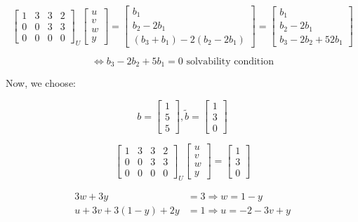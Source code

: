 \[
  \begin{bmatrix}
    1 & 3 & 3 & 2 \\
    0 & 0 & 3 & 3 \\
    0 & 0 & 0 & 0
  \end{bmatrix}_U 
  \begin{bmatrix}
    u \\ v \\ w \\y
  \end{bmatrix} = 
  \begin{bmatrix}
    b_1 \\ b_2 - 2b_1 \\ (b_3 + b_1) - 2(b_2 - 2b_1)
  \end{bmatrix} = 
    \begin{bmatrix}
    b_1 \\ b_2 - 2b_1 \\ b_3 - 2b_2 + 52b_1
  \end{bmatrix}
\]

\[
  \iff b_3 - 2b_2 + 5b_1 = 0 \text{ solvability condition}
\]

Now, we choose:

\[
  b = \begin{bmatrix}
    1 \\ 5 \\ 5
  \end{bmatrix},
  \tilde{b} = \begin{bmatrix}
    1 \\ 3 \\ 0
  \end{bmatrix}
\]

\[
  \begin{bmatrix}
    1 & 3 & 3 & 2 \\
    0 & 0 & 3 & 3 \\
    0 & 0 & 0 & 0
  \end{bmatrix}_U 
  \begin{bmatrix}
    u \\ v \\ w \\y
  \end{bmatrix} =
  \begin{bmatrix}
    1 \\ 3 \\ 0
  \end{bmatrix}
\]

\begin{align*}
  3w + 3y &= 3 \Rightarrow w = 1 - y \\
  u + 3v + 3(1-y) + 2y &= 1 \Rightarrow u = -2 - 3v + y
\end{align*}

